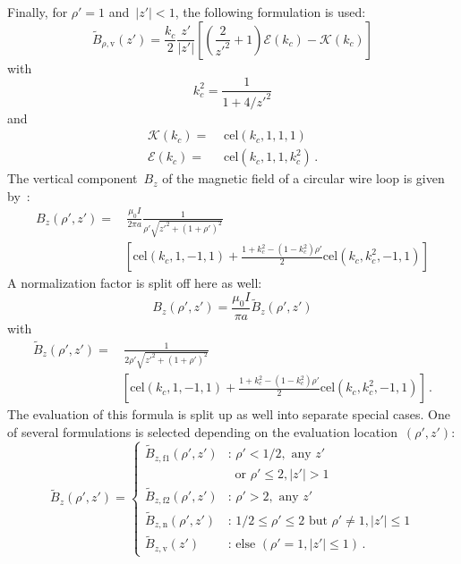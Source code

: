 Finally, for $\rho'=1$ and~$|z'| < 1$, the following formulation is used:
\begin{equation}
  \tilde{B}_{\rho,\mathrm{v}} (z')
  = \frac{k_c}{2} \frac{z'}{|z'|} \left[ \left( \frac{2}{z'^2} + 1 \right) \mathcal{E}(k_c) - \mathcal{K}(k_c) \right] \label{eqn:cwl_B_rho_v}
\end{equation}
with
\begin{equation}
  k_c^2 = \frac{1}{1 + 4/{z'}^2}
\end{equation}
and
\begin{align}
  \mathcal{K}(k_c) =&\, \,\mathrm{cel}(k_c, 1, 1, 1) \\
  \mathcal{E}(k_c) =&\, \,\mathrm{cel}(k_c, 1, 1, k_c^2) \, .
\end{align}
The vertical component~$B_z$ of the magnetic field of a circular wire loop is given by~\cite{teal}:
\begin{align}
 B_z(\rho', z')
 =&\, \frac{\mu_0 I}{2 \pi a}
   \frac{1}{\rho' \sqrt{z'^2 + (1 + \rho')^2}} \nonumber \\
 ~& \left[
       \textrm{cel}(k_c, 1, -1, 1)
     + \frac{1 + k_c^2 - \left( 1 - k_c^2 \right) \rho'}{2} \textrm{cel}(k_c, k_c^2, -1, 1)
   \right]
\end{align}
A normalization factor is split off here as well:
\begin{equation}
  B_z(\rho', z') = \frac{\mu_0 I}{\pi a} \tilde{B}_z(\rho', z')
\end{equation}
with
\begin{align}
  \tilde{B}_z(\rho', z')
  =&\, \frac{1}{2 \rho' \sqrt{z'^2 + (1 + \rho')^2}} \nonumber \\
 ~& \left[
       \textrm{cel}(k_c, 1, -1, 1)
     + \frac{1 + k_c^2 - \left( 1 - k_c^2 \right) \rho'}{2} \textrm{cel}(k_c, k_c^2, -1, 1)
   \right] \, .
\end{align}
The evaluation of this formula is split up as well into separate special cases.
One of several formulations is selected depending on the evaluation location~$(\rho', z')$:
\begin{equation}
  \tilde{B}_z(\rho', z')
  = \begin{cases}
      \tilde{B}_{z,\mathrm{f1}} (\rho', z') &:\, \rho' < 1/2, \textrm{ any } z' \\
                ~                           &~ \textrm{ or } \rho' \leq 2, |z'| > 1 \\
      \tilde{B}_{z,\mathrm{f2}} (\rho', z') &:\, \rho' > 2, \textrm{ any } z' \\
      \tilde{B}_{z,\mathrm{n}}  (\rho', z') &:\, 1/2 \leq \rho' \leq 2 \textrm{ but } \rho' \neq 1, |z'| \leq 1 \\
      \tilde{B}_{z,\mathrm{v}}  (z') &:\, \textrm{else } (\rho' = 1, |z'| \leq 1) \, .
    \end{cases} \label{eqn:cwl_B_z_switchover}
\end{equation}
